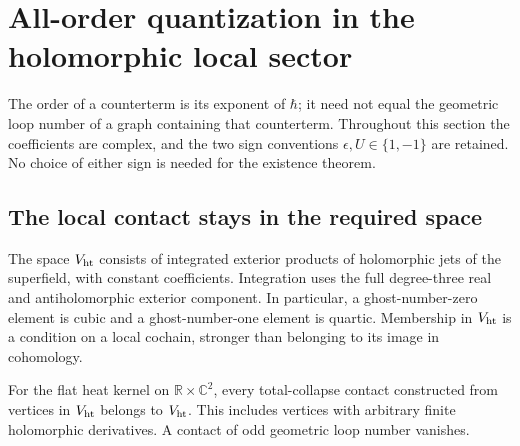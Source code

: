 \section{All-order quantization in the holomorphic local sector}
\label{sec:all-orders}

The order of a counterterm is its exponent of $\hbar$; it need not equal
the geometric loop number of a graph containing that counterterm.
Throughout this section the coefficients are complex, and the two sign
conventions $\epsilon,U\in\{1,-1\}$ are retained.  No choice of either
sign is needed for the existence theorem.

\subsection{The local contact stays in the required space}

The space $V_{\mathrm{ht}}$ consists of integrated exterior products of holomorphic
jets of the superfield, with constant coefficients.  Integration uses the
full degree-three real and antiholomorphic exterior component.  In
particular, a ghost-number-zero element is cubic and a
ghost-number-one element is quartic.  Membership in $V_{\mathrm{ht}}$ is a condition
on a local cochain, stronger than belonging to its image in cohomology.

\begin{lemma}
\label{lem:full-wedge-contacts}
For the flat heat kernel on $\mathbb R\times\mathbb C^2$, every
total-collapse contact constructed from vertices in $V_{\mathrm{ht}}$ belongs to
$V_{\mathrm{ht}}$.  This includes vertices with arbitrary finite holomorphic
derivatives.  A contact of odd geometric loop number vanishes.
\end{lemma}

